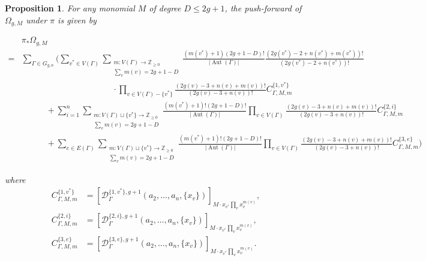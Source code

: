 \documentclass[12pt,reqno]{amsart}
\DeclareMathOperator{\Aut}{Aut}
\theoremstyle{plain}
\newtheorem{proposition}[theorem]{Proposition}
\theoremstyle{definition}
\theoremstyle{remark}
\begin{document}
\begin{proposition}
\label{prop:omega_g,m-formula-pi-pushforward}
For any monomial $M$ of degree $D\leq 2g+1$, the push-forward of $\Omega_{g,M}$ under $\pi$ is given by
\begin{small}
\begin{align*}
&\pi_* \Omega_{g, M}
\\=&
\sum_{\Gamma\in G_{g,n}}
\Bigg(\sum_{v^*\in V(\Gamma)}\sum_{\substack{m\colon V(\Gamma) \to \mathbb Z_{\ge 0} \\ \sum_v m(v) = 2g + 1 - D}}
    \frac{(m(v^*) + 1)(2g + 1 - D)!}{|\Aut(\Gamma)|}
    \frac{(2g(v^*) - 2 + n(v^*) + m(v^*))!}{(2g(v^*) - 2 + n(v^*))!}
    \\&\hspace{130pt}\cdot\prod_{v \in V(\Gamma)-\{v^*\}} \frac{(2g(v) - 3 + n(v) + m(v))!}{(2g(v) - 3 + n(v))!}C^{\{1,v^*\}}_{\Gamma,M,m}
   \\&\hspace{35pt}+\sum_{i=1}^{n}\sum_{\substack{m\colon V(\Gamma)\sqcup \{v^*\}\rightarrow\mathbb{Z}_{\geq0}\\ \sum_{v}m(v)=2g+1-D}}\frac{(m(v^*) + 1)!(2g + 1 - D)!}{|\Aut(\Gamma)|}
    \prod_{v \in V(\Gamma)} \frac{(2g(v) - 3 + n(v) + m(v))!}{(2g(v) - 3 + n(v))!}C^{\{2,i\}}_{\Gamma,M,m}
    \\&\hspace{35pt}+\sum_{e\in E(\Gamma)}\sum_{\substack{m\colon V(\Gamma)\sqcup \{v^*\}\rightarrow\mathbb{Z}_{\geq0}\\ \sum_{v}m(v)=2g+1-D}}\frac{(m(v^*) + 1)!(2g + 1 - D)!}{|\Aut(\Gamma)|}
    \prod_{v \in V(\Gamma)} \frac{(2g(v) - 3 + n(v) + m(v))!}{(2g(v) - 3 + n(v))!}C^{\{3,e\}}_{\Gamma,M,m}\Bigg)
\end{align*} 
\end{small}
where
\begin{align*}
  C^{\{1,v^*\}}_{\Gamma, M, m} &= [\mathcal{D}^{\{1,v^*\}, g+1}_{\Gamma}(a_2, \dotsc, a_n, \{x_v\})]_{M \cdot x_{v^*} \prod_v x_v^{m(v)}}, \\
  C^{\{2,i\}}_{\Gamma, M, m} &= [\mathcal{D}^{\{2,i\}, g+1}_{\Gamma}(a_2, \dotsc, a_n, \{x_v\})]_{M \cdot x_{v^*} \prod_v x_v^{m(v)}}, \\
  C^{\{3,e\}}_{\Gamma, M, m} &= [\mathcal{D}^{\{3,e\}, g+1}_{\Gamma}(a_2, \dotsc, a_n, \{x_v\})]_{M \cdot x_{v^*} \prod_v x_v^{m(v)}}.
\end{align*}
\end{proposition}
\end{document}
